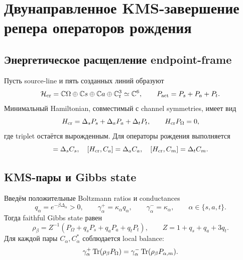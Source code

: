 \chapter{Двунаправленное KMS-завершение репера операторов рождения}
\label{ch:v9-endpoint-creation-kms-completion}

\section{Энергетическое расщепление endpoint-frame}

Пусть source-line и пять созданных линий образуют
\begin{equation}
 \mathcal H_{\rm cr}=\mathbb C\Omega\oplus\mathbb C s\oplus
 \mathbb C a\oplus\mathbb C^3_t\simeq\mathbb C^6,
 \qquad P_{\rm act}=P_s+P_a+P_t.
 \label{eq:v9-kms-completion-carrier}
\end{equation}
Минимальный Hamiltonian, совместимый с channel symmetries, имеет вид
\begin{equation}
 H_{\rm cr}=\Delta_sP_s+\Delta_aP_a+\Delta_tP_t,
 \qquad H_{\rm cr}P_\Omega=0,
 \label{eq:v9-kms-completion-hamiltonian}
\end{equation}
где triplet остаётся вырожденным. Для операторы рождения выполняется
\begin{equation}
 [H_{\rm cr},C_s]=\Delta_sC_s,
 \quad [H_{\rm cr},C_a]=\Delta_aC_a,
 \quad [H_{\rm cr},C_m]=\Delta_tC_m.
 \label{eq:v9-kms-completion-bohr-relations}
\end{equation}

\section{KMS-пары и Gibbs state}

Введём положительные Boltzmann ratios и conductances
\begin{equation}
 q_\alpha=e^{-\beta\Delta_\alpha}>0,
 \qquad \gamma_\alpha^+=\kappa_\alpha q_\alpha,
 \qquad \gamma_\alpha^-=\kappa_\alpha,
 \qquad \alpha\in\{s,a,t\}.
 \label{eq:v9-kms-completion-rates}
\end{equation}
Тогда faithful Gibbs state равен
\begin{equation}
 \rho_\beta=Z^{-1}(P_\Omega+q_sP_s+q_aP_a+q_tP_t),
 \qquad Z=1+q_s+q_a+3q_t.
 \label{eq:v9-kms-completion-gibbs-state}
\end{equation}
Для каждой пары $C_\alpha,C_\alpha^*$ соблюдается local balance:
\begin{equation}
 \gamma_\alpha^+\operatorname{Tr}(\rho_\beta P_\Omega)
 =\gamma_\alpha^-\operatorname{Tr}(\rho_\beta P_{\alpha,m}).
 \label{eq:v9-kms-completion-local-balance}
\end{equation}

